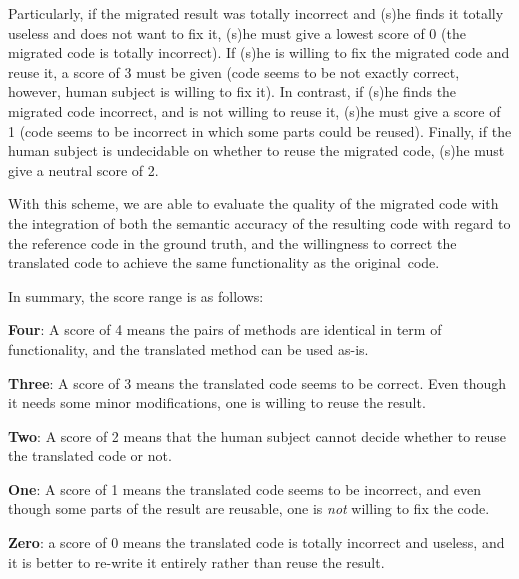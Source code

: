 %
Particularly, if the migrated result was totally incorrect and (s)he
finds it totally useless and does not want to fix it, (s)he must give
a lowest score of 0 (\ie the migrated code is totally incorrect).
%
If (s)he is willing to fix the migrated code and reuse it, a score of
3 must be given (code seems to be not exactly correct, however, human
subject is willing to fix it). In contrast, if (s)he finds the
migrated code incorrect, and is not willing to reuse it, (s)he must
give a score of 1 (code seems to be incorrect in which some parts
could be reused). Finally, if the human subject is undecidable on
whether to reuse the migrated code, (s)he must give a neutral score of
2.

With this scheme, we are able to evaluate the quality of the migrated
code with the integration of both the semantic accuracy of the
resulting code with regard to the reference code in the ground truth,
and the willingness to correct the translated code to achieve the same
functionality as the original~code.


%

In summary, the score range is as follows:

\begin{compactitem}

\item {\bf Four}: A score of 4 means the pairs of methods are
  identical in term of functionality, and the translated method can be
  used as-is.

\item {\bf Three}: A score of 3 means the translated code seems to be
  correct. Even though it needs some minor modifications, one is
  willing to reuse the result.

\item {\bf Two}: A score of 2 means that the human subject cannot
  decide whether to reuse the translated code or not.

\item {\bf One}: A score of 1 means the translated code seems to be
  incorrect, and even though some parts of the result are reusable,
  one is {\em not} willing to fix the code.

\item {\bf Zero}: a score of 0 means the translated code is totally
  incorrect and useless, and it is better to re-write it entirely
  rather than reuse the result.

\end{compactitem}


